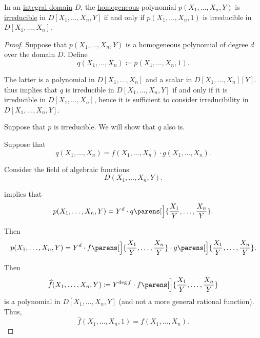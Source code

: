 \begin{proposition}\label{thm:homogeneous_polynomial_constant}
  In an \hyperref[def:integral_domain]{integral domain} \( D \), the \hyperref[def:homogeneous_polynomial]{homogeneous} polynomial \( p(X_1, \ldots, X_n, Y) \) is \hyperref[def:domain_divisibility/irreducible]{irreducible} in \( D[X_1, \ldots, X_n, Y] \) if and only if \( p(X_1, \ldots, X_n, 1) \) is irreducible in \( D[X_1, \ldots, X_n] \).
\end{proposition}
\begin{proof}
  Suppose that \( p(X_1, \ldots, X_n, Y) \) is a homogeneous polynomial of degree \( d \) over the domain \( D \). Define
  \begin{equation*}
    q(X_1, \ldots, X_n) \coloneqq p(X_1, \ldots, X_n, 1).
  \end{equation*}

  The latter is a polynomial in \( D[X_1, \ldots, X_n] \) and a scalar in \( D[X_1, \ldots, X_n][Y] \).  thus implies that \( q \) is irreducible in \( D[X_1, \ldots, X_n, Y] \) if and only if it is irreducible in \( D[X_1, \ldots, X_n] \), hence it is sufficient to consider irreducibility in \( D[X_1, \ldots, X_n, Y] \).

  \SufficiencySubProof Suppose that \( p \) is irreducible. We will show that \( q \) also is.

  Suppose that
  \begin{equation*}
    q(X_1, \ldots, X_n) = f(X_1, \ldots, X_n) \cdot g(X_1, \ldots, X_n).
  \end{equation*}

  Consider the field of algebraic functions
  \begin{equation*}
    D(X_1, \ldots, X_n, Y).
  \end{equation*}

   implies that
  \begin{equation*}
    p(X_1, \ldots, X_n, Y) = Y^d \cdot q\parens[\Big]{ \frac {X_1} Y, \ldots, \frac {X_n} Y }.
  \end{equation*}

  Then
  \begin{equation*}
    p(X_1, \ldots, X_n, Y) = Y^d \cdot f\parens[\Big]{ \frac {X_1} Y, \ldots, \frac {X_n} Y } \cdot g\parens[\Big]{ \frac {X_1} Y, \ldots, \frac {X_n} Y }.
  \end{equation*}

  Then
  \begin{equation*}
    \widehat{f}(X_1, \ldots, X_n, Y) \coloneqq Y^{\deg f} \cdot f\parens[\Big]{ \frac {X_1} Y, \ldots, \frac {X_n} Y }
  \end{equation*}
  is a polynomial in \( D[X_1, \ldots, X_n, Y] \) (and not a more general rational function). Thus,
  \begin{equation*}
    \widehat{f}(X_1, \ldots, X_n, 1) = f(X_1, \ldots, X_n).
  \end{equation*}


\end{proof}
